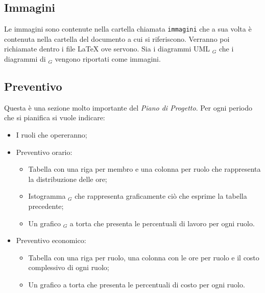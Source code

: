 \subsection{Immagini}
Le immagini sono contenute nella cartella chiamata \texttt{immagini} che a sua volta è contenuta nella cartella del documento a cui si riferiscono. Verranno poi richiamate dentro i file \LaTeX{} ove servono. Sia i diagrammi UML $_G$ che i diagrammi di  $_G$ vengono riportati come immagini.
\subsection{Preventivo}
Questa è una sezione molto importante del \textit{Piano di Progetto}.
Per ogni periodo che si pianifica si vuole indicare:
\begin{itemize}
    \item I ruoli che opereranno;
    \item Preventivo orario:
        \begin{itemize}
            \item Tabella con una riga per membro e una colonna per ruolo che rappresenta la distribuzione delle ore;
            \item Istogramma $_G$ che rappresenta graficamente ciò che esprime la tabella precedente;
            \item Un grafico $_G$ a torta che presenta le percentuali di lavoro per ogni ruolo.
        \end{itemize}
    \item Preventivo economico:
        \begin{itemize}
            \item Tabella con una riga per ruolo, una colonna con le ore per ruolo e il costo complessivo di ogni ruolo;
            \item Un grafico a torta che presenta le percentuali di costo per ogni ruolo.
        \end{itemize}
\end{itemize}

